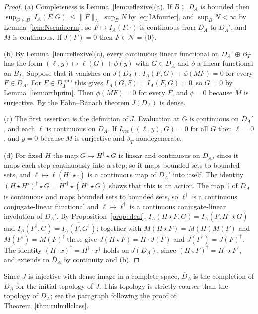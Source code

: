 \documentclass[11pt]{amsart}
\theoremstyle{definition}
\theoremstyle{remark}
\newcommand{\DA}{D_A}
\newcommand{\Nrad}{\mathcal N}
\newcommand{\BT}{B_T}
\newcommand{\NAd}{\overline{D}_A}
\begin{document}
\begin{proof}
(a)  Completeness is Lemma~\ref{lem:reflexive}(a).  If $B\subseteq\DA$ is
bounded then
$\sup_{G\in B}|I_A(F,G)|\le\lVert F\rVert_{L^{1}}\sup_BN$ by
\eqref{eq:IAfourier}, and $\sup_BN<\infty$ by Lemma~\ref{lem:Nseminorm}; so
$F\mapsto I_A(F,\cdot)$ is continuous from $\DA$ to $\DA'$, and $M$ is
continuous.  If $J(F)=0$ then $F\in\Nrad=\{0\}$.

(b)  By Lemma~\ref{lem:reflexive}(c), every continuous linear functional on
$\DA'\oplus\BT$ has the form $(\ell,y)\mapsto\ell(G)+\phi(y)$ with $G\in\DA$
and $\phi$ a linear functional on $\BT$.  Suppose that it vanishes on
$J(\DA)$: $I_A(F,G)+\phi(MF)=0$ for every $F\in\DA$.  For
$F\in\DA^{\mathrm{prim}}$ this gives $I_A(G,F)=\overline{I_A(F,G)}=0$, so
$G=0$ by Lemma~\ref{lem:orthprim}.  Then $\phi(MF)=0$ for every $F$, and
$\phi=0$ because $M$ is surjective.  By the Hahn--Banach theorem $J(\DA)$ is
dense.

(c)  The first assertion is the definition of $J$.  Evaluation at $G$ is
continuous on $\DA'$, and each $\ell$ is continuous on $\DA$.  If
$I_{\mathrm{vec}}((\ell,y),G)=0$ for all $G$ then $\ell=0$, and $y=0$ because
$M$ is surjective and $\beta_T$ nondegenerate.

(d)  For fixed $H$ the map $G\mapsto H^{\dagger}\star G$ is linear and
continuous on $\DA$, since it maps each step continuously into a step; so it
maps bounded sets to bounded sets, and $\ell\mapsto\ell(H^{\dagger}\star\cdot)$
is a continuous map of $\DA'$ into itself.  The identity
$(H\star H')^{\dagger}\star G=H'^{\dagger}\star(H^{\dagger}\star G)$ shows
that this is an action.  The map $\dagger$ of $\DA$ is continuous and maps
bounded sets to bounded sets, so $\ell^{\dagger}$ is a continuous
conjugate-linear functional and $\ell\mapsto\ell^{\dagger}$ is a continuous
conjugate-linear involution of $\DA'$.  By Proposition~\ref{prop:ideal},
$I_A(H\star F,G)=I_A(F,H^{\dagger}\star G)$ and
$I_A(F^{\dagger},G)=\overline{I_A(F,G^{\dagger})}$; together with
$M(H\star F)=M(H)M(F)$ and $M(F^{\dagger})=M(F)^{\sharp}$ these give
$J(H\star F)=H\cdot J(F)$ and $J(F^{\dagger})=J(F)^{\dagger}$.  The identity
$(H\cdot x)^{\dagger}=H^{\dagger}\cdot x^{\dagger}$ holds on $J(\DA)$, since
$(H\star F)^{\dagger}=H^{\dagger}\star F^{\dagger}$, and extends to $\NAd$ by
continuity and (b).
\end{proof}

Since $J$ is injective with dense image in a complete space, $\NAd$ is the
completion of $\DA$ for the initial topology of $J$.  This topology is
strictly coarser than the topology of $\DA$; see the paragraph following the
proof of Theorem~\ref{thm:rulnullclass}.
\end{document}

